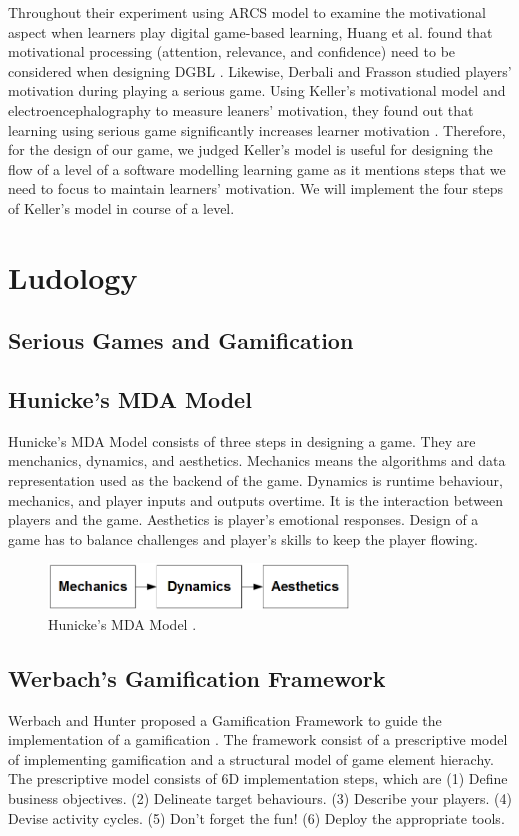 \documentclass[12pt, a4paper]{report}
\begin{document}
Throughout their experiment using ARCS model to examine the motivational aspect when learners play digital game-based learning, Huang et al. found that motivational processing (attention, relevance, and confidence) need to be considered when designing DGBL \cite{huang2010sustaining}. Likewise, Derbali and Frasson studied players' motivation during playing a serious game. Using Keller's motivational model and  electroencephalography to measure leaners' motivation, they found out that learning using serious game significantly increases learner motivation \cite{derbali2010players}. Therefore, for the design of our game, we judged Keller's model is useful for designing the flow of a level of a software modelling learning game as it mentions steps that we need to focus to maintain learners' motivation. We will implement the four steps of Keller's model in course of a level.  

\section{Ludology}

\subsection{Serious Games and Gamification}


\subsection{Hunicke's MDA Model}
Hunicke's MDA Model \cite{hunicke2004mda} consists of three steps in designing a game. They are menchanics, dynamics, and aesthetics. Mechanics means the algorithms and data representation used as the backend of the game. Dynamics is runtime behaviour, mechanics, and player inputs and outputs overtime. It is the interaction between players and the game. Aesthetics is player's emotional responses. Design of a  game has to balance challenges and player's skills to keep the player flowing.

\begin{figure}[ht]
\centering
\includegraphics[width=8cm]{mda}
\caption{Hunicke's MDA Model \cite{hunicke2004mda}.}
\label{fig:mda}
\end{figure}

\subsection{Werbach's Gamification Framework}
Werbach and Hunter proposed a Gamification Framework to guide the implementation of a gamification \cite{werbach2012win}. The framework consist of  a prescriptive model of implementing gamification and a structural model of game element hierachy. The prescriptive model consists of 6D implementation steps, which are (1) Define  business objectives. (2) Delineate target behaviours. (3) Describe your players. (4) Devise activity cycles. (5) Don't forget the fun! (6) Deploy the appropriate tools.
\end{document}
